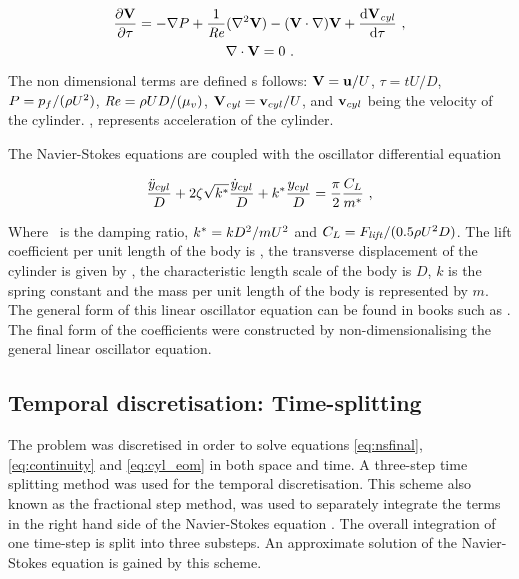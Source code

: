   \begin{equation} \centering
  \label{eq:nsfinal}
  \pderiv{\vecV}{\tau} = -\grad{\Pres} + \frac{1}{\Rey}(\gradsq{\vecV}) - (\vecV\cdot\nabla)\vecV + \accframe ~,
  \end{equation}
  \begin{equation}
  \label{eq:continuity}
  \nabla\cdot\mathbf{V} = 0~.
  \end{equation}
  
   The non dimensional terms are defined s follows: $\mathbf{V} = \mathbf{u}/U$, $\tau = tU/D$, $P = p_{f}/(\rho
  U^{2})$, $\mathit{Re} = \rho UD/(\mu_{v})$, $\mathbf{V}_{\mathit{cyl}} = \mathbf{v}_{cyl}/U$, and 
  $\mathbf{v}_{cyl}$ being the velocity of the cylinder. \accframe, represents acceleration of the cylinder.  
  
  The Navier-Stokes equations are coupled with the oscillator differential equation 
  
  \begin{equation} \centering
  \label{eq:cyl_eom}
  \frac{\ddot{y}_{cyl}}{D} + 2\damping\sqrt{\kstar}\frac{\dot{y}_{cyl}}{D} + \kstar\frac{\ycyl}{D} = \frac{\pi}{2}\frac{\clift}{\mstar} ~,
  \end{equation}

  
    Where \damping \ is the damping ratio,  $k^{*}=kD^{2}/mU^{2}$ and
    $C_{L} = F_{\mathit{lift}}/(0.5\rho U^{2}D)$. The lift
    coefficient per unit length of the body is \clift, the transverse displacement of the cylinder is given by \ycyl,  the characteristic length scale of the body is $D$, $k$ is the spring constant and the mass per unit length of the body is represented by $m$. The general form of this linear oscillator equation can be found in books such as  \citet{Naudasher94}. The final form of the coefficients were constructed by non-dimensionalising the general linear oscillator equation. 
    
    
 
 \subsection{Temporal discretisation: Time-splitting}
 
 The problem was discretised in order to solve equations \ref{eq:nsfinal}, \ref{eq:continuity} and \ref{eq:cyl_eom} in both space and time. A three-step time splitting method was used for the temporal discretisation. This scheme also known as the fractional step method, was used to separately integrate the terms in the right hand side of the Navier-Stokes equation \citep{karniadakis2005}. The overall integration of one time-step is split into three substeps. An approximate solution of the Navier-Stokes equation is gained by this scheme. 
 
